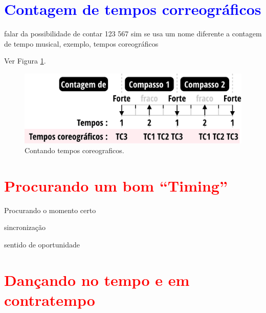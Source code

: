 \section{\textcolor{blue}{Contagem de tempos correográficos}}
\label{sec:TemposCoreograficos}

falar da possibilidade de contar 123 567 sim se usa um nome diferente a contagem de tempo musical,
exemplo, tempos coreográficos

Ver Figura \ref{fig:contagemtempocoreografico}.
\begin{figure}
    \centering
    \includegraphics[width=\textwidth]{chapters/cap-musicalidade/contagemtempocoreografico.eps}
    \caption{Contando tempos coreograficos.}
    \label{fig:contagemtempocoreografico}
\end{figure}



\section{\textcolor{red}{Procurando um bom ``Timing''}}
Procurando o momento certo

 sincronização 

 sentido de oportunidade 


\section{\textcolor{red}{Dançando no tempo e em contratempo}}


